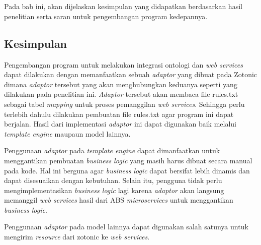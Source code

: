 \chapter{\babEnam}
Pada bab ini, akan dijelaskan kesimpulan yang didapatkan berdasarkan hasil penelitian serta saran untuk pengembangan program kedepannya.
\section{Kesimpulan}
Pengembangan program untuk melakukan integrasi ontologi dan \textit{web services} dapat dilakukan dengan memanfaatkan sebuah \textit{adaptor} yang dibuat pada Zotonic dimana \textit{adaptor} tersebut yang akan menghubungkan keduanya seperti yang dilakukan pada penelitian ini. \textit{Adaptor} tersebut akan membaca file rules.txt sebagai tabel \textit{mapping} untuk proses pemanggilan \textit{web services}. Sehingga perlu terlebih dahulu dilakukan pembuatan file rules.txt agar program ini dapat berjalan. Hasil dari implementasi \textit{adaptor} ini dapat digunakan baik melalui \textit{template engine} maupaun model lainnya.

Penggunaan \textit{adaptor} pada \textit{template engine} dapat dimanfaatkan untuk menggantikan pembuatan \textit{business logic} yang masih harus dibuat secara manual pada kode. Hal ini berguna agar \textit{business logic} dapat bersifat lebih dinamis dan dapat disesuaikan dengan kebutuhan. Selain itu, pengguna tidak perlu mengimplementasikan \textit{business logic} lagi karena \textit{adaptor} akan langsung memanggil \textit{web services} hasil dari ABS \textit{microservices} untuk menggantikan \textit{business logic}.

Penggunaan \textit{adaptor} pada model lainnya dapat digunakan salah satunya untuk mengirim \textit{resource} dari zotonic ke \textit{web services}.

